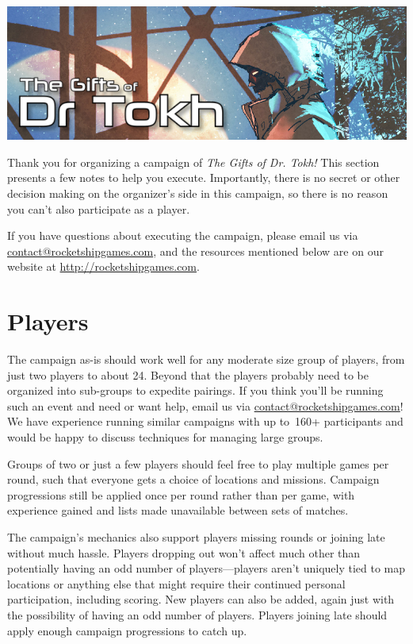 \documentclass{tokh}
\begin{document}
\centerline{\includegraphics[width=\linewidth]{art/cover/tokh-banner.pdf}}

\bigskip
\bigskip
{}

\noindent%
Thank you for organizing a campaign of \textit{The Gifts of Dr. Tokh!}
This section presents a few notes to help you execute.  Importantly,
there is no secret or other decision making on the organizer's side in
this campaign, so there is no reason you can't also participate as a
player.

If you have questions about executing the campaign, please email us
via \url{contact@rocketshipgames.com}, and the resources mentioned
below are on our website at \url{http://rocketshipgames.com}.

\section{Players}

The campaign as-is should work well for any moderate size group of
players, from just two players to about 24.  Beyond that the players
probably need to be organized into sub-groups to expedite pairings.
If you think you'll be running such an event and need or want help,
email us via \url{contact@rocketshipgames.com}!  We have experience
running similar campaigns with up to~160+ participants and would be
happy to discuss techniques for managing large groups.

Groups of two or just a few players should feel free to play multiple
games per round, such that everyone gets a choice of locations and
missions.  Campaign progressions still be applied once per round
rather than per game, with experience gained and lists made
unavailable between sets of matches.

The campaign's mechanics also support players missing rounds or
joining late without much hassle.  Players dropping out won't affect
much other than potentially having an odd number of players---players
aren't uniquely tied to map locations or anything else that might
require their continued personal participation, including scoring.
New players can also be added, again just with the possibility of
having an odd number of players.  Players joining late should apply
enough campaign progressions to catch up.
\end{document}
